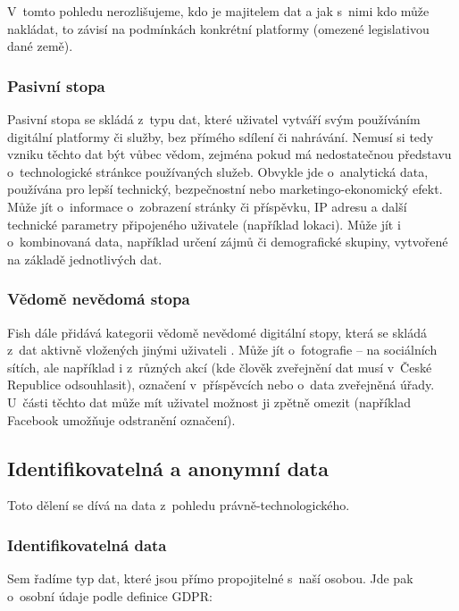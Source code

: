 V~tomto pohledu nerozlišujeme, kdo je majitelem dat a jak s~nimi kdo může nakládat, to závisí na podmínkách konkrétní platformy (omezené legislativou dané země).

\subsubsection*{Pasivní stopa}

Pasivní stopa se skládá z~typu dat, které uživatel vytváří svým používáním digitální platformy či služby, bez přímého sdílení či nahrávání. Nemusí si tedy vzniku těchto dat být vůbec vědom, zejména pokud má nedostatečnou představu o~technologické stránkce používaných služeb. Obvykle jde o~analytická data, používána pro lepší technický, bezpečnostní nebo marketingo-ekonomický efekt. Může jít o~informace o~zobrazení stránky či příspěvku, IP adresu a další technické parametry připojeného uživatele (například lokaci). Může jít i o~kombinovaná data, například určení zájmů či demografické skupiny, vytvořené na základě jednotlivých dat.

\subsubsection*{Vědomě nevědomá stopa}

Fish dále přidává kategorii vědomě nevědomé digitální stopy, která se skládá z~dat aktivně vložených jinými uživateli \citep{fish-digital-footprint}.
Může jít o~fotografie -- na sociálních sítích, ale například i z~různých akcí (kde člověk zveřejnění dat musí v~České Republice odsouhlasit), označení v~příspěvcích nebo o~data zveřejněná úřady. U~části těchto dat může mít uživatel možnost ji zpětně omezit (například Facebook umožňuje odstranění označení).

\subsection{Identifikovatelná a anonymní data}
Toto dělení se dívá na data z~pohledu právně-technologického.

\subsubsection*{Identifikovatelná data}

Sem řadíme typ dat, které jsou přímo propojitelné s~naší osobou. Jde pak o~osobní údaje podle definice GDPR:

\begin{displayquote}
	\citep{gdpr}
\end{displayquote}

